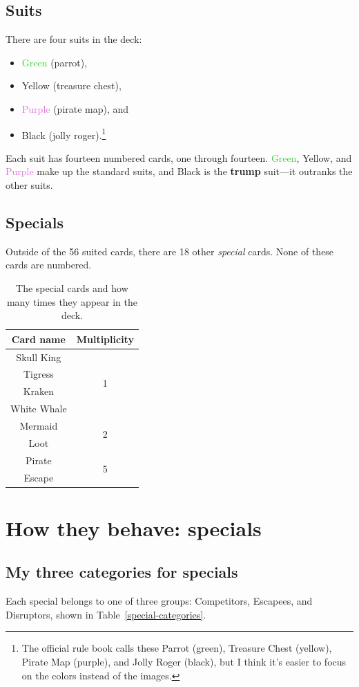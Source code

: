 \documentclass{article}
\newcommand{\Green}{\textcolor{LimeGreen}{Green}}
\newcommand{\Purple}{\textcolor{Orchid}{Purple}}
\newcommand{\Yellow}{\textcolor{Apricot}{Yellow}}
\newcommand{\Black}{Black}
\begin{document}
\subsection{Suits}
There are four suits in the deck:\pagebreak
\begin{itemize}
\item \Green{} (parrot),
\item \Yellow{} (treasure chest), 
\item \Purple{} (pirate map), and
\item \Black{} (jolly roger).\footnote{The official rule book calls these Parrot (green), Treasure Chest (yellow), Pirate Map (purple), and Jolly Roger (black), but I think it's easier to focus on the colors instead of the images.}
\end{itemize}
Each suit has fourteen numbered cards, one through fourteen. \Green, \Yellow, and \Purple{} make up the standard suits, and \Black{} is the \textbf{trump} suit---it outranks the other suits.

\subsection{Specials}\label{specials}
Outside of the 56 suited cards, there are 18 other \textit{special} cards. None of these cards are numbered.

\begin{table}[h]
\centering
\caption{The special cards and how many times they appear in the deck.}
\begin{tabular}{|c|c|}
\hline
Card name & Multiplicity \\
\hline
Skull King  & \multirow{4}{*}{1} \\
Tigress &  \\
Kraken & \\
White Whale & \\
\hline
Mermaid & \multirow{2}{*}{2} \\
Loot   & \\
\hline
Pirate & \multirow{2}{*}{5} \\
Escape & \\
\hline
\end{tabular}
\end{table}

\section{How they behave: specials}
\subsection*{My three categories for specials}
Each special belongs to one of three groups: Competitors, Escapees, and Disruptors, shown in Table~\ref{special-categories}. 
\end{document}
